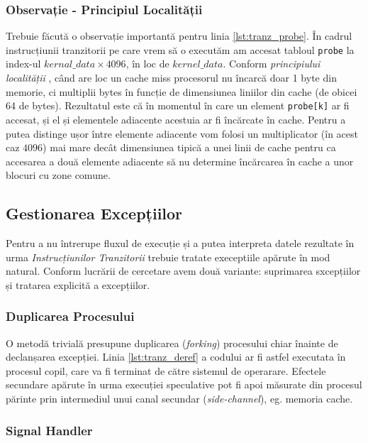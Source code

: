 \subsubsection{Observație - Principiul Localității}\label{sec:locality}

Trebuie făcută o observație importantă pentru linia \ref{lst:tranz_probe}. În cadrul
instrucțiunii tranzitorii pe care vrem să o executăm am accesat tabloul
\texttt{probe} la index-ul $kernal\_data \times 4096$, în loc de
$kernel\_data$. Conform \emph{principiului localității}
\cite{denning2006locality}, când are loc un cache miss procesorul nu încarcă
doar 1 byte din memorie, ci multiplii bytes în funcție de dimensiunea liniilor
din cache (de obicei 64 de bytes). Rezultatul este că în momentul în care un
element \texttt{probe[k]} ar fi accesat, și el și elementele adiacente acestuia
ar fi încărcate în cache. Pentru a putea distinge ușor între elemente adiacente
vom folosi un multiplicator (în acest caz $4096$) mai mare decât dimensiunea 
tipică a unei linii de cache pentru ca accesarea a două elemente adiacente să nu
determine încărcarea în cache a unor blocuri cu zone comune.

\subsection{Gestionarea Excepțiilor}

Pentru a nu întrerupe fluxul de execuție și a putea interpreta datele rezultate
în urma \emph{Instrucțiunilor Tranzitorii} trebuie tratate execeptiile apărute
în mod natural. Conform lucrării de cercetare \cite{meltdown2018} avem două
variante: suprimarea sxcepțiilor și tratarea explicită a excepțiilor.

\subsubsection{Duplicarea Procesului}

O metodă trivială presupune duplicarea (\emph{forking}) procesului chiar înainte
de declanșarea excepției. Linia \ref{lst:tranz_deref} a codului ar fi astfel executata în procesul
copil, care va fi terminat de către sistemul de operarare. Efectele secundare 
apărute în urma execuției speculative pot fi apoi măsurate din procesul părinte
prin intermediul unui canal secundar (\emph{side-channel}), eg. memoria cache.

\subsubsection{Signal Handler}

